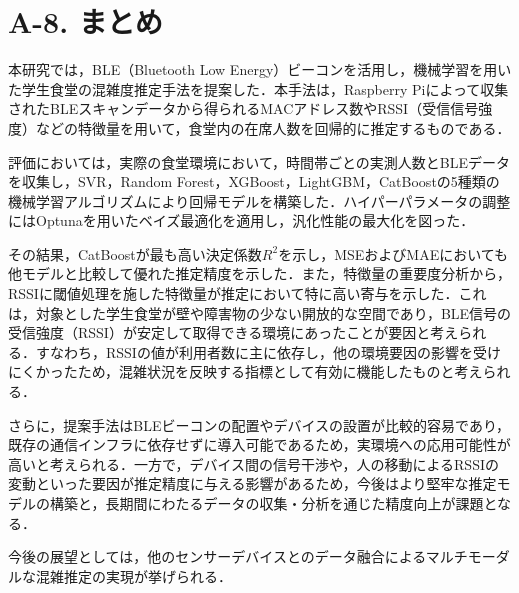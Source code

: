 \section*{A-8. まとめ}

本研究では，BLE（Bluetooth Low Energy）ビーコンを活用し，機械学習を用いた学生食堂の混雑度推定手法を提案した．本手法は，Raspberry Piによって収集されたBLEスキャンデータから得られるMACアドレス数やRSSI（受信信号強度）などの特徴量を用いて，食堂内の在席人数を回帰的に推定するものである．

評価においては，実際の食堂環境において，時間帯ごとの実測人数とBLEデータを収集し，SVR，Random Forest，XGBoost，LightGBM，CatBoostの5種類の機械学習アルゴリズムにより回帰モデルを構築した．ハイパーパラメータの調整にはOptunaを用いたベイズ最適化を適用し，汎化性能の最大化を図った．

その結果，CatBoostが最も高い決定係数$R^2$を示し，MSEおよびMAEにおいても他モデルと比較して優れた推定精度を示した．また，特徴量の重要度分析から，RSSIに閾値処理を施した特徴量が推定において特に高い寄与を示した．これは，対象とした学生食堂が壁や障害物の少ない開放的な空間であり，BLE信号の受信強度（RSSI）が安定して取得できる環境にあったことが要因と考えられる．すなわち，RSSIの値が利用者数に主に依存し，他の環境要因の影響を受けにくかったため，混雑状況を反映する指標として有効に機能したものと考えられる．

さらに，提案手法はBLEビーコンの配置やデバイスの設置が比較的容易であり，既存の通信インフラに依存せずに導入可能であるため，実環境への応用可能性が高いと考えられる．一方で，デバイス間の信号干渉や，人の移動によるRSSIの変動といった要因が推定精度に与える影響があるため，今後はより堅牢な推定モデルの構築と，長期間にわたるデータの収集・分析を通じた精度向上が課題となる．

今後の展望としては，他のセンサーデバイスとのデータ融合によるマルチモーダルな混雑推定の実現が挙げられる．
